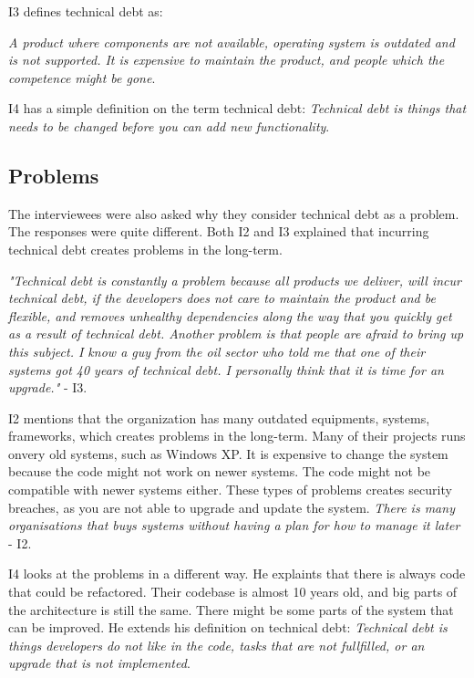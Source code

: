 I3 defines technical debt as:
\begin{displayquote}
\textit{A product where components are not available, operating system is outdated and is not supported. It is expensive to maintain the product, and people which the competence might be gone}.
\end{displayquote}

I4 has a simple definition on the term technical debt: \textit{Technical debt is things that needs to be changed before you can add new functionality}.



\subsection{Problems}
The interviewees were also asked why they consider technical debt as a problem. The responses were quite different. Both I2 and I3 explained that incurring technical debt creates problems in the long-term. 

\begin{displayquote}
	\textit{"Technical debt is constantly a problem because all products we deliver, will incur technical debt, if the developers does not care to maintain the product and be flexible, and removes unhealthy dependencies along the way that you quickly get as a result of technical debt. Another problem is that people are afraid to bring up this subject. I know a guy from the oil sector who told me that one of their systems got 40 years of technical debt. I personally think that it is time for an upgrade."} - I3.
\end{displayquote}


I2 mentions that the organization has many outdated equipments, systems, frameworks, which creates problems in the long-term. Many of their projects runs onvery old systems, such as Windows XP. It is expensive to change the system because the code might not work on newer systems. The code might not be compatible with newer systems either. These types of problems creates security breaches, as you are not able to upgrade and update the system. \textit{There is many organisations that buys systems without having a plan for how to manage it later} - I2.

I4 looks at the problems in a different way. He explaints that there is always code that could be refactored. Their codebase is almost 10 years old, and big parts of the architecture is still the same. There might be some parts of the system that can be improved. He extends his definition on technical debt: \textit{Technical debt is things developers do not like in the code, tasks that are not fullfilled, or an upgrade that is not implemented}. 

